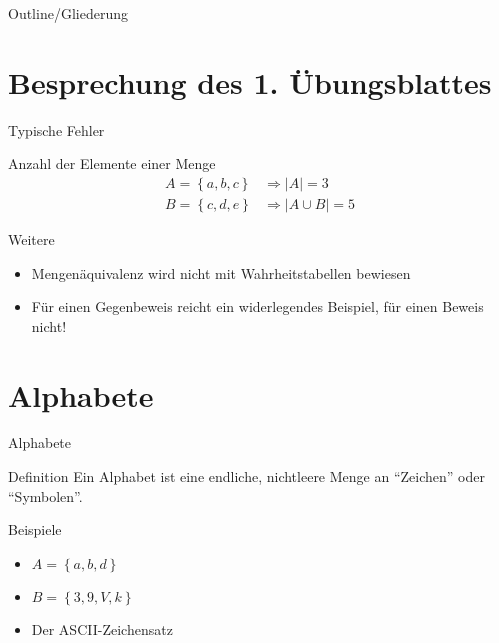 
\subtitle{Foliensatz 02}
\date{1. November 2012}


\begin{frame}
    \titlepage
\end{frame}

\begin{frame}{Outline/Gliederung}
    \tableofcontents
\end{frame}

\section{Besprechung des 1. Übungsblattes}
\begin{frame}{Typische Fehler}
    \begin{exampleblock}{Anzahl der Elemente einer Menge}
        \begin{align*}
            A = \left\{ a, b , c\right\} & \Rightarrow \left| A \right| = 3\\
            B = \left\{c, d, e\right\} & \Rightarrow \left| A \cup B \right| = 5
        \end{align*}
    \end{exampleblock}
    \begin{exampleblock}{Weitere}
            \begin{itemize}
                \item Mengenäquivalenz wird nicht mit Wahrheitstabellen bewiesen
                \item Für einen Gegenbeweis reicht ein widerlegendes Beispiel, für einen Beweis nicht!
            \end{itemize}
    \end{exampleblock}
\end{frame}

\section{Alphabete}
\begin{frame}{Alphabete}
    \begin{block}{Definition}
        Ein Alphabet ist eine endliche, nichtleere Menge an "`Zeichen"' oder "`Symbolen"'.
    \end{block}
    \begin{exampleblock}{Beispiele}
        \begin{itemize}
            \item $A = \left\{a, b, d\right\}$
            \item $B = \left\{3, 9, V, k\right\} $
            \item Der ASCII-Zeichensatz
        \end{itemize}
    \end{exampleblock}
\end{frame}

